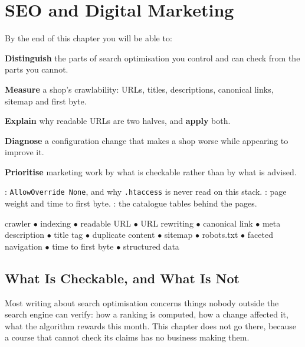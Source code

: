 \chapter{SEO and Digital Marketing}\label{ch:seo}

\begin{outcomes}
By the end of this chapter you will be able to:
\begin{tight}
  \item \textbf{Distinguish} the parts of search optimisation you control and
        can check from the parts you cannot.
  \item \textbf{Measure} a shop's crawlability: URLs, titles, descriptions,
        canonical links, sitemap and first byte.
  \item \textbf{Explain} why readable URLs are two halves, and \textbf{apply}
        both.
  \item \textbf{Diagnose} a configuration change that makes a shop worse while
        appearing to improve it.
  \item \textbf{Prioritise} marketing work by what is checkable rather than by
        what is advised.
\end{tight}
\end{outcomes}

\begin{prereq}
: \texttt{AllowOverride None}, and why \texttt{.htaccess} is
never read on this stack. : page weight and time to first byte.
: the catalogue tables behind the pages.
\end{prereq}

\begin{keyterms}
crawler $\bullet$ indexing $\bullet$ readable URL $\bullet$ URL rewriting
$\bullet$ canonical link $\bullet$ meta description $\bullet$ title tag
$\bullet$ duplicate content $\bullet$ sitemap $\bullet$ robots.txt $\bullet$
faceted navigation $\bullet$ time to first byte $\bullet$ structured data
\end{keyterms}

\section{What Is Checkable, and What Is Not}

Most writing about search optimisation concerns things nobody outside the
search engine can verify: how a ranking is computed, how a change affected it,
what the algorithm rewards this month. This chapter does not go there, because
a course that cannot check its claims has no business making them.

